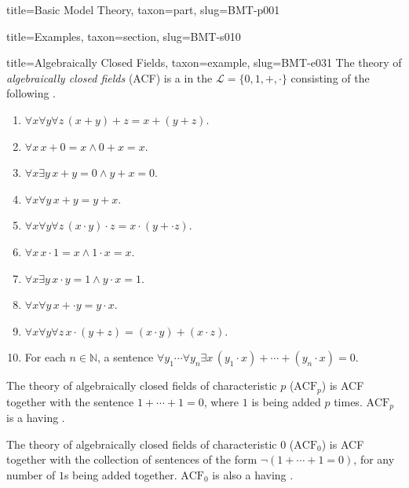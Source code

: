 \documentclass[a4paper]{article}
\begin{document}
\begin{tree}{title={Basic Model Theory}, taxon={part}, slug={BMT-p001}}
\begin{tree}{title={Examples}, taxon={section}, slug={BMT-s010}}
\begin{tree}{title={Algebraically Closed Fields}, taxon={example}, slug={BMT-e031}}
    The theory of \emph{algebraically closed fields} (ACF) is a  in the  \(\mathcal  L= \{ 0,1,+, \cdot \}\)
    consisting of the following .
    \begin{enumerate}
\item{\(\forall  x \forall  y \forall  z \, (x+y)+z=x+(y+z)\).
        }
        \item{\(\forall  x \, x+0=x \land0 +x=x\).
        }
        \item{\(\forall  x \exists  y \, x+y=0 \land  y+x=0\).
        }
        \item{\(\forall  x \forall  y \, x+y=y+x\).
        }
        \item{\(\forall  x \forall  y \forall  z \, (x \cdot  y) \cdot  z=x \cdot  (y+ \cdot  z)\).
        }
        \item{\(\forall  x \, x \cdot1 =x \land1 \cdot  x=x\).
        }
        \item{\(\forall  x \exists  y \, x \cdot  y=1 \land  y \cdot  x=1\).
        }
        \item{\(\forall  x \forall  y \, x+ \cdot  y=y \cdot  x\).
        }
        \item{\(\forall  x \forall  y \forall  z \, x \cdot (y+z)=(x \cdot  y)+(x \cdot  z)\).
        }
        \item{
            For each \(n \in \mathbb  N\), a sentence \(\forall  y_1 \cdots \forall  y_n \exists  x \, (y_1 \cdot  x)+ \cdots +(y_n \cdot  x)=0\).
        }
\end{enumerate}\par{
    The theory of algebraically closed fields of characteristic \(p\) (\(\text {ACF}_p\)) is ACF together with the sentence
    \(1+ \cdots +1=0\), where \(1\) is being added \(p\) times. \(\text {ACF}_p\) is a  having
    .
}\par{
    The theory of algebraically closed fields of characteristic \(0\) (\(\text {ACF}_0\)) is ACF together with the collection of sentences
    of the form \(\neg (1+ \cdots +1=0)\), for any number of \(1\)s being added together. \(\text {ACF}_0\) is also a
     having .
}
\end{tree}

\end{tree}


\end{tree}
\end{document}
